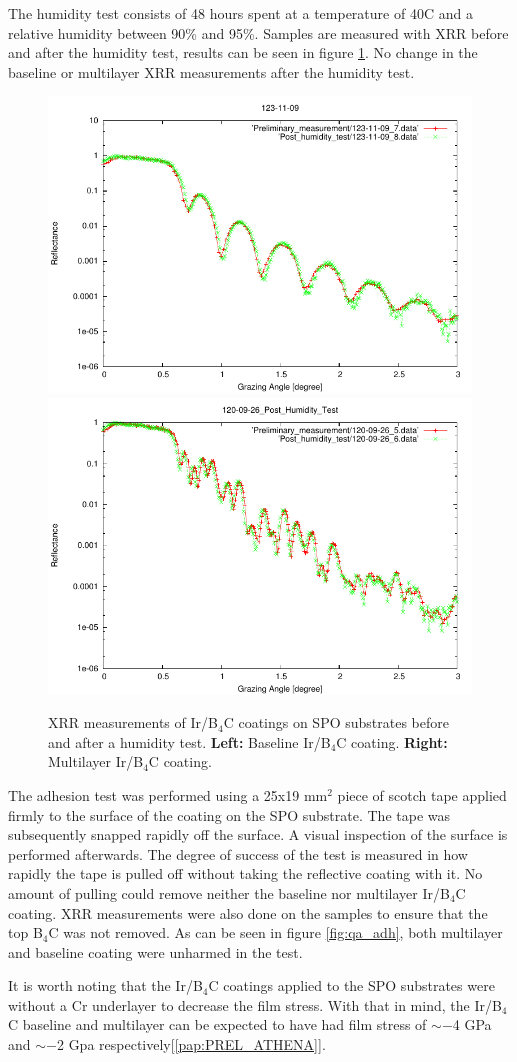 The humidity test consists of 48 hours spent at a temperature of 40\degr C and a relative humidity between 90\% and 95\%. Samples are measured with XRR before and after the humidity test, results can be seen in figure \ref{fig:qa_hum}. No change in the baseline or multilayer XRR measurements after the humidity test.

\begin{figure}[!h]
  \center  \includegraphics[width=0.47\linewidth]{figures/athena/coating_on_spo/123-11-09_Post_Humidity_test.pdf}
  \includegraphics[width=0.47\linewidth]{figures/athena/coating_on_spo/120-09-26_Post_Humidity_Test.pdf}
\caption{\footnotesize XRR measurements of Ir/B$_4$C coatings on SPO substrates before and after a humidity test. \textbf{Left:} Baseline Ir/B$_4$C coating. \textbf{Right:} Multilayer Ir/B$_4$C coating.}\label{fig:qa_hum}
\end{figure}

The adhesion test was performed using a 25x19 mm$^2$ piece of scotch tape applied firmly to the surface of the coating on the SPO substrate. The tape was subsequently snapped rapidly off the surface. A visual inspection of the surface is performed afterwards. The degree of success of the test is measured in how rapidly the tape is pulled off without taking the reflective coating with it. No amount of pulling could remove neither the baseline nor multilayer Ir/B$_4$C coating. XRR measurements were also done on the samples to ensure that the top B$_4$C was not removed. As can be seen in figure \ref{fig:qa_adh}, both multilayer and baseline coating were unharmed in the test.

It is worth noting that the Ir/B$_4$C coatings applied to the SPO substrates were without a Cr underlayer to decrease the film stress. With that in mind, the Ir/B$_4$C baseline and multilayer can be expected to have had film stress of $\sim-$4 GPa and $\sim-$2 Gpa respectively[\ref{pap:PREL_ATHENA}].

